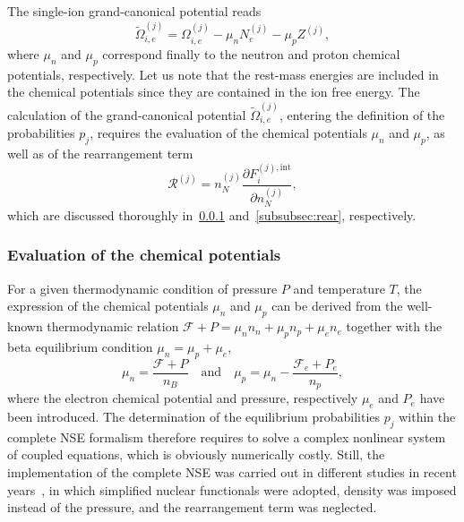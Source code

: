 %
The single-ion grand-canonical potential reads
%
\begin{equation}
  \tilde{\Omega}_{i,e}^{(j)} = \Omega_{i,e}^{(j)} - \mu_n N_e^{(j)} -
  \mu_p Z^{(j)},
\end{equation}
%
where $\mu_n$ and $\mu_p$ correspond finally to the neutron and proton 
chemical potentials, respectively. Let us note that the rest-mass energies are 
included in the chemical potentials since they are contained in the ion 
free energy. 
The calculation of the grand-canonical potential $\tilde{\Omega}_{i,e}^{(j)}$, 
entering the definition of the probabilities $p_j$, requires the 
evaluation of the chemical potentials $\mu_n$ and $\mu_p$, as well as of the 
rearrangement term
%
\begin{equation}
  \mathcal{R}^{(j)} = n_N^{(j)} 
  \frac{\partial F_i^{(j),\text{int}}}{\partial n_N^{(j)}},
\end{equation}
%
which are discussed thoroughly in~\ref{subsubsec:chempoteval}
and~\ref{subsubsec:rear}, respectively.

\subsubsection{Evaluation of the chemical
potentials}\label{subsubsec:chempoteval}

For a given thermodynamic condition of pressure $P$ and temperature $T$, the
expression of the chemical potentials $\mu_n$ and $\mu_p$ can be derived from 
the well-known thermodynamic relation $\mathcal{F} + P = \mu_n n_n + \mu_p n_p 
+ \mu_e n_e$ together with the beta equilibrium condition $\mu_n = \mu_p + 
\mu_e$,
%
\begin{equation}
  \mu_n = \frac{\mathcal{F} + P}{n_B} \quad \text{and} \quad
  \mu_p = \mu_n - \frac{\mathcal{F}_e + P_e}{n_p},\label{eq:munmup}
\end{equation}
%
where the electron chemical potential and pressure, respectively $\mu_e$ and
$P_e$ have been introduced.
The determination of the equilibrium probabilities $p_j$ within the complete 
NSE formalism therefore requires to solve a complex nonlinear system of coupled 
equations, which is obviously numerically costly. Still, the implementation of 
the complete NSE was carried out in different studies in recent
years~\cite{Oertel2017,Burgio2018}, in which simplified nuclear functionals 
were adopted, density was imposed instead of the pressure, and the 
rearrangement term was neglected.

